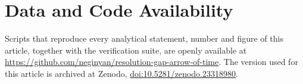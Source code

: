 \section*{Data and Code Availability}
Scripts that reproduce every analytical statement, number and figure of this article, together with the verification suite, are openly available at \url{https://github.com/neginyan/resolution-gap-arrow-of-time}. The version used for this article is archived at Zenodo, \href{https://doi.org/10.5281/zenodo.23318980}{doi:10.5281/zenodo.23318980}.
